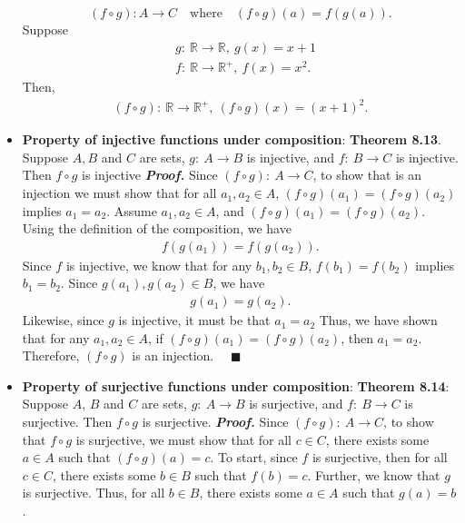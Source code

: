 \documentclass{report}
\begin{document}
\begin{itemize}
            \[
                (f \circ g) : A \to C \quad \text{where} \quad (f \circ g)(a) = f(g(a)).
            \]
            Suppose 
            \begin{align*}
                &g:\ \mathbb{R} \to \mathbb{R},\ g(x) = x+1 \\
                &f:\ \mathbb{R} \to \mathbb{R}^{+},\ f(x) = x^{2}
            .\end{align*}
            Then,
            \begin{align*}
                (f\circ g):\ \mathbb{R} \to \mathbb{R}^{+},\ (f\circ g)(x) = (x+1)^{2}
            .\end{align*}
        \item \textbf{Property of injective functions under composition}:
            \bigbreak \noindent 
            \textbf{Theorem 8.13}. Suppose $A, B$ and $C$ are sets, $g:\ A \to B$ is injective, and $f:\ B \to C$ is injective. Then $f \circ g$ is injective
            \bigbreak \noindent 
            \textbf{\textit{Proof.}} Since $(f\circ g):\ A \to C$, to show that is an injection we must show that for all $a_{1}, a_{2}\in A$, $(f\circ g)(a_{1}) = (f\circ g)(a_{2}) $ implies $a_{1} = a_{2}$. Assume $a_{1}, a_{2} \in A$, and $(f\circ g)(a_{1}) = (f\circ g)(a_{2})$. Using the definition of the composition, we have
            \begin{align*}
                f(g(a_{1})) = f(g(a_{2}))
            .\end{align*}
            Since $f$ is injective, we know that for any $b_{1}, b_{2} \in B$, $f(b_{1}) = f(b_{2}) $ implies $b_{1} = b_{2}$. Since $g(a_{1}), g(a_{2}) \in B$, we have
            \begin{align*}
                g(a_{1}) = g(a_{2})
            .\end{align*}
            Likewise, since $g$ is injective, it must be that $a_{1}  = a_{2}$
            \bigbreak \noindent 
            Thus, we have shown that for any $a_{1}, a_{2} \in A$, if $(f\circ g)(a_{1}) = (f\circ g)(a_{2})$, then $a_{1} = a_{2}$. Therefore, $(f\circ g)$ is an injection. $\quad \blacksquare $
        \item \textbf{Property of surjective functions under composition}:
            \bigbreak \noindent 
            \textbf{Theorem 8.14}: Suppose $A$, $B$ and $C$ are sets, $g:\ A \to B$ is surjective, and $f:\ B \to C$ is surjective. Then $f \circ g$ is surjective.
            \bigbreak \noindent 
            \textbf{\textit{Proof.}} Since $(f\circ g):\ A \to C$, to show that $f\circ g$ is surjective, we must show that for all $c\in C$, there exists some $a\in A$ such that $(f\circ g)(a) = c$. To start, since $f$ is surjective, then for all $c\in C$, there exists some $b\in B$ such that $f(b) = c$. Further, we know that $g$ is surjective. Thus, for all $b\in B$, there exists some $a\in A$ such that $g(a) = b$. 

\end{itemize}
\end{document}
